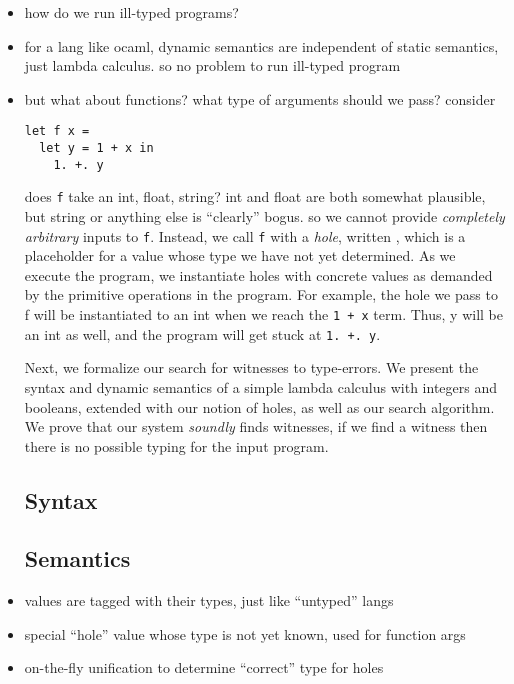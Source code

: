 
\begin{itemize}
\item how do we run ill-typed programs?
\item for a lang like ocaml, dynamic semantics are independent of static
  semantics, just lambda calculus. so no problem to run ill-typed
  program
\item but what about functions? what type of arguments should we pass? consider

\begin{lstlisting}
let f x = 
  let y = 1 + x in
    1. +. y
\end{lstlisting}

does \texttt{f} take an int, float, string? int and float are both
somewhat plausible, but string or anything else is ``clearly'' bogus. so
we cannot provide \emph{completely arbitrary} inputs to
\texttt{f}. Instead, we call \texttt{f} with a \emph{hole}, written
\hole{}, which is a placeholder for a value whose type we have not
yet determined. As we execute the program, we instantiate holes with
concrete values as demanded by the primitive operations in the
program. For example, the hole we pass to f will be instantiated to an
int when we reach the \lstinline{1 + x} term. Thus, y will be an int as
well, and the program will get stuck at \lstinline{1. +. y}. 

Next, we formalize our search for witnesses to type-errors. We present
the syntax and dynamic semantics of a simple lambda calculus with
integers and booleans, extended with our notion of holes, as well as our
search algorithm. We prove that our system \emph{soundly} finds
witnesses, \ie if we find a witness then there is no possible typing for
the input program.

\subsection{Syntax}
\label{sec:syntax}


\subsection{Semantics}
\label{sec:semantics}



\item values are tagged with their types, just like ``untyped'' langs
\item special ``hole'' value whose type is not yet known, used for function args
\item on-the-fly unification to determine ``correct'' type for holes
\end{itemize}


